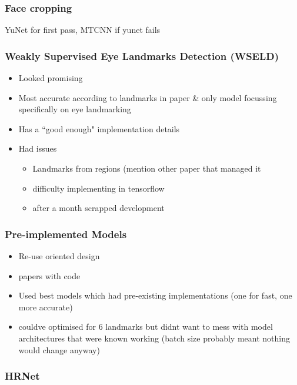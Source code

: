 \subsubsection{Face cropping}

YuNet for first pass, MTCNN if yunet fails

\subsubsection{Weakly Supervised Eye Landmarks Detection (WSELD)}

\begin{itemize}
    \item Looked promising
    \item Most accurate according to landmarks in paper \& only model focussing specifically on eye landmarking
    \item Has a ``good enough" implementation details
    \item Had issues
    \begin{itemize}
        \item Landmarks from regions (mention other paper that managed it
        \item difficulty implementing in tensorflow
        \item after a month scrapped development
    \end{itemize}
\end{itemize}

\subsubsection{Pre-implemented Models}

\begin{itemize}
    \item Re-use oriented design
    \item papers with code
    \item Used best models which had pre-existing implementations (one for fast, one more accurate)
    \item couldve optimised for 6 landmarks but didnt want to mess with model architectures that were known working (batch size probably meant nothing would change anyway)
\end{itemize}

\subsubsection{HRNet}

